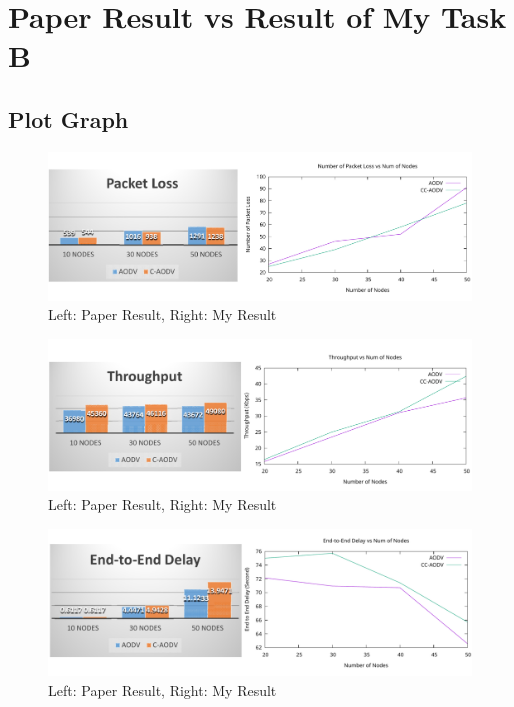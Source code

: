 \documentclass[12pt, a4paper]{article}
\begin{document}
\section{Paper Result vs Result of My Task B}
\subsection{Plot Graph}
% 
\begin{figure}[H]
\centering
\includegraphics[scale = 0.4]{images/paper/matching-01.png}
\caption{Left: Paper Result, Right: My Result}
\end{figure}

\begin{figure}[H]
\centering
\includegraphics[scale = 0.4]{images/paper/matching-02.png}
\caption{Left: Paper Result, Right: My Result}
\end{figure}

\begin{figure}[H]
\centering
\includegraphics[scale = 0.4]{images/paper/matching-03.png}
\caption{Left: Paper Result, Right: My Result}
\end{figure}
\end{document}
